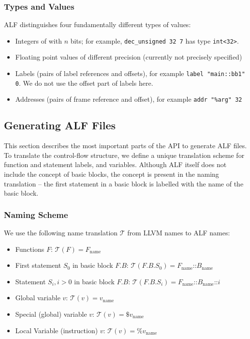 \subsubsection{Types and Values}
ALF distinguishes four fundamentally different types of values:
\begin{itemize}
\item Integers of with $n$ bits; for example, \verb|dec_unsigned 32 7| has type \verb|int<32>|.
\item Floating point values of different precision (currently not precisely specified)
\item Labels (pairs of label references and offsets), for example \verb|label "main::bb1" 0|.
We do not use the offset part of labels here.
\item Addresses (pairs of frame reference and offset), for example \verb|addr "%arg" 32|
\end{itemize}

\subsection{Generating ALF Files}
This section describes the most important parts of the API to generate
ALF files. To translate the control-flow structure, we define a unique
translation scheme for function and statement labels, and
variables. Although ALF itself does not include the concept of basic
blocks, the concept is present in the naming translation -- the first
statement in a basic block is labelled with the name of the basic
block.

\subsubsection{Naming Scheme}
We use the following name translation $\mathcal{T}$ from LLVM names to ALF names:
\begin{itemize}
\item Functions $F$: $\mathcal{T}(F) = F_{\text{name}}$
\item First statement $S_0$ in basic block $F.B$: $\mathcal{T}(F.B.S_0) =
      F_{\text{name}}\texttt{::}B_{\text{name}}$
\item Statement $S_i, i > 0$ in basic block $F.B$: $\mathcal{T}(F.B.S_i) =
      F_{\text{name}}\texttt{::}B_{\text{name}}\texttt{::}i$
\item Global variable $v$: $\mathcal{T}(v) = v_{\text{name}}$
\item Special (global) variable $v$: $\mathcal{T}(v) = \texttt{\$}v_{\text{name}}$
\item Local Variable (instruction) $v$: $\mathcal{T}(v) = \texttt{\%}v_{\text{name}}$
\end{itemize}

